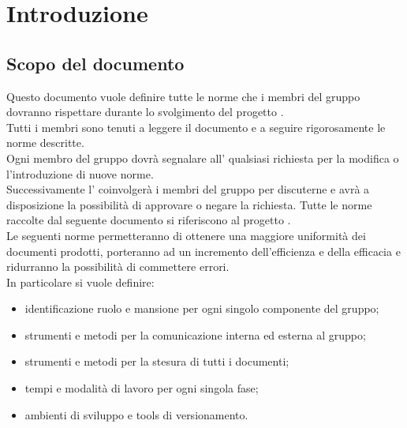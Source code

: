 %


\section{Introduzione}

\subsection{Scopo del documento}
Questo documento vuole definire tutte le norme che i membri del gruppo \groupName{} dovranno rispettare durante lo svolgimento del progetto \projectName.\\
Tutti i membri sono tenuti a leggere il documento e a seguire rigorosamente le norme descritte.\\
Ogni membro del gruppo dovrà segnalare all'\roleAdministrator{} qualsiasi richiesta per la modifica o l'introduzione di nuove norme.\\
Successivamente l'\roleAdministrator{} coinvolgerà i membri del gruppo per discuterne e avrà a disposizione la possibilità di approvare o negare la richiesta.
Tutte le norme raccolte dal seguente documento si riferiscono al progetto \projectName.\\
Le seguenti norme permetteranno di ottenere una maggiore uniformità dei documenti prodotti, porteranno ad un incremento dell'efficienza e della efficacia e ridurranno la possibilità di commettere errori.\\
In particolare si vuole definire:
\begin{itemize}
	\item identificazione ruolo e mansione per ogni singolo componente del gruppo;
	\item strumenti e metodi per la comunicazione interna ed esterna al gruppo;
	\item strumenti e metodi per la stesura di tutti i documenti;
	\item tempi e modalità di lavoro per ogni singola fase;
	\item ambienti di sviluppo e tools di versionamento.
\end{itemize}

